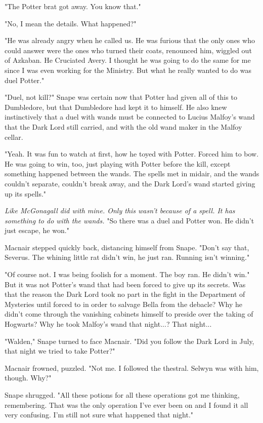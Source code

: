 "The Potter brat got away. You know that."

"No, I mean the details. What happened?"

"He was already angry when he called us. He was furious that the only ones who could answer were the ones who turned their coats, renounced him, wiggled out of Azkaban. He Cruciated Avery. I thought he was going to do the same for me since I was even working for the Ministry. But what he really wanted to do was duel Potter."

"Duel, not kill?" Snape was certain now that Potter had given all of this to Dumbledore, but that Dumbledore had kept it to himself. He also knew instinctively that a duel with wands must be connected to Lucius Malfoy's wand that the Dark Lord still carried, and with the old wand maker in the Malfoy cellar.

"Yeah. It was fun to watch at first, how he toyed with Potter. Forced him to bow. He was going to win, too, just playing with Potter before the kill, except something happened between the wands. The spells met in midair, and the wands couldn't separate, couldn't break away, and the Dark Lord's wand started giving up its spells."

\emph{Like McGonagall did with mine. Only this wasn't because of a spell. It has something to do with the wands.} "So there was a duel and Potter won. He didn't just escape, he won."

Macnair stepped quickly back, distancing himself from Snape. "Don't say that, Severus. The whining little rat didn't win, he just ran. Running isn't winning."

"Of course not. I was being foolish for a moment. The boy ran. He didn't win." But it was not Potter's wand that had been forced to give up its secrets. Was that the reason the Dark Lord took no part in the fight in the Department of Mysteries until forced to in order to salvage Bella from the debacle? Why he didn't come through the vanishing cabinets himself to preside over the taking of Hogwarts? Why he took Malfoy's wand that night...? That night...

"Walden," Snape turned to face Macnair. "Did you follow the Dark Lord in July, that night we tried to take Potter?"

Macnair frowned, puzzled. "Not me. I followed the thestral. Selwyn was with him, though. Why?"

Snape shrugged. "All these potions for all these operations got me thinking, remembering. That was the only operation I've ever been on and I found it all very confusing. I'm still not sure what happened that night."

